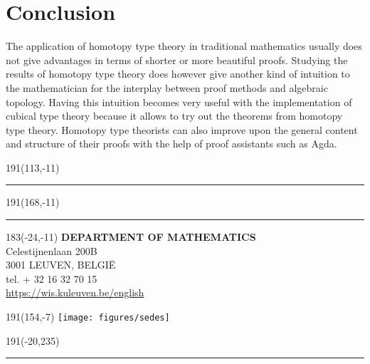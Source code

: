 \documentclass[11pt,a4paper,twoside,xetex,draft]{book}
\begin{document}
\chapter*{Conclusion}

The application of homotopy type theory in traditional mathematics usually does not give advantages in terms of shorter or more beautiful proofs. Studying the results of homotopy type theory does however give another kind of intuition to the mathematician for the interplay between proof methods and algebraic topology. Having this intuition becomes very useful with the implementation of cubical type theory because it allows to try out the theorems from homotopy type theory. Homotopy type theorists can also improve upon the general content and structure of their proofs with the help of proof assistants such as Agda. 



\clearpage
{}
\printindex

\newpage



\newpage
\thispagestyle{empty}

\sffamily
%
\begin{textblock}{191}(113,-11)
{\color{blueline}\rule{160pt}{5.5pt}}
\end{textblock}
%
\begin{textblock}{191}(168,-11)
{\color{blueline}\rule{5.5pt}{59pt}}
\end{textblock}
%
\begin{textblock}{183}(-24,-11)
\textblockcolour{}
\flushright
\fontsize{7}{7.5}\selectfont
\textbf{DEPARTMENT OF MATHEMATICS}\\
Celestijnenlaan 200B\\
3001 LEUVEN, BELGI\"{E}\\
tel. + 32 16 32 70 15 \\
\url{https://wis.kuleuven.be/english}\\
\end{textblock}
%
\begin{textblock}{191}(154,-7)
\textblockcolour{}
\texttt{[image: figures/sedes]}
\end{textblock}
%
\begin{textblock}{191}(-20,235)
{\color{bluetitle}\rule{544pt}{55pt}}
\end{textblock}
\end{document}
